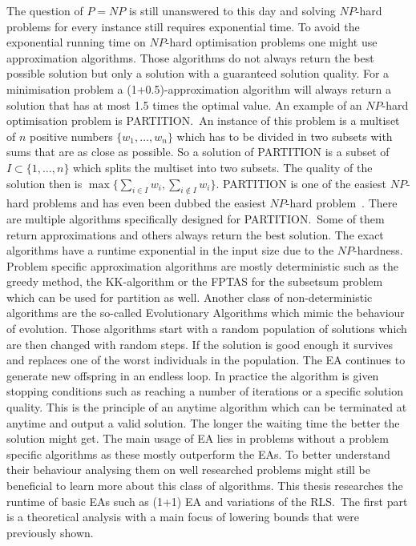 The question of $P=NP$ is still unanswered to this day and solving $NP$-hard problems for every instance still requires exponential time.
To avoid the exponential running time on $NP$-hard optimisation problems one might use approximation algorithms.
Those algorithms do not always return the best possible solution but only a solution with a guaranteed solution quality.
For a minimisation problem a (1+0.5)-approximation algorithm will always return a solution that has at most 1.5 times the optimal value.
An example of an $NP$-hard optimisation problem is PARTITION.\ 
An instance of this problem is a multiset of $n$ positive numbers $\{w_1,\dots,w_n\}$ which has to be divided in two subsets with sums that are as close as possible.
So a solution of PARTITION is a subset of $I\subset \{1,\dots,n\}$ which splits the multiset into two subsets.
The quality of the solution then is $\max\{\sum_{i\in I}w_i, \sum_{i\notin I}w_i\}$.
PARTITION is one of the easiest $NP$-hard problems and has even been dubbed the easiest $NP$-hard problem~\cite{hayes2002computing}.
There are multiple algorithms specifically designed for PARTITION.\ 
Some of them return approximations and others always return the best solution.
The exact algorithms have a runtime exponential in the input size due to the $NP$-hardness.
Problem specific approximation algorithms are mostly deterministic such as the greedy method, the KK-algorithm or the FPTAS for the subsetsum problem which can be used for partition as well.
Another class of non-deterministic algorithms are the so-called Evolutionary Algorithms which mimic the behaviour of evolution.
Those algorithms start with a random population of solutions which are then changed with random steps.
If the solution is good enough it survives and replaces one of the worst individuals in the population.
The EA continues to generate new offspring in an endless loop.
In practice the algorithm is given stopping conditions such as reaching a number of iterations or a specific solution quality.
This is the principle of an anytime algorithm which can be terminated at anytime and output a valid solution.
The longer the waiting time the better the solution might get.
The main usage of EA lies in problems without a problem specific algorithms as these mostly outperform the EAs.
To better understand their behaviour analysing them on well researched problems might still be beneficial to learn more about this class of algorithms.
This thesis researches the runtime of basic EAs such as (1+1) EA and variations of the RLS.\ 
The first part is a theoretical analysis with a main focus of lowering bounds that were previously shown.
